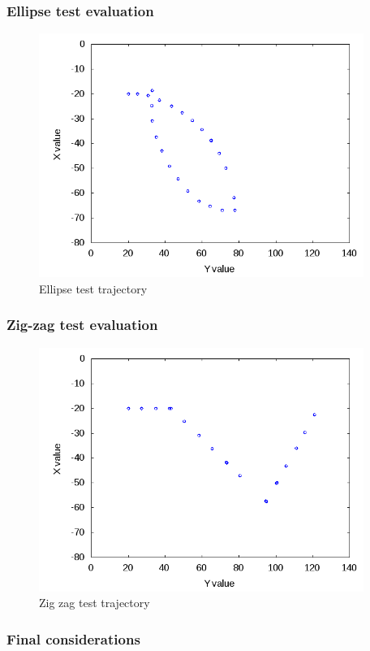 \subsubsection{Ellipse test evaluation}
\label{subsubsec:ellipsetest}

\begin{figure}[!h]
  \begin{center}
    \includegraphics[width=300pt]{img/path_session_5.png}
    \caption{Ellipse test trajectory}
    \label{fig:openglspace}
  \end{center}
\end{figure}
%


\subsubsection{Zig-zag test evaluation}
\label{subsubsec:zigzagtest}

\begin{figure}[!h]
  \begin{center}
    \includegraphics[width=300pt]{img/path_session_6.png}
    \caption{Zig zag test trajectory}
    \label{fig:openglspace}
  \end{center}
\end{figure}
%


\subsubsection{Final considerations}
\label{subsubsec:finalconsiderations}
